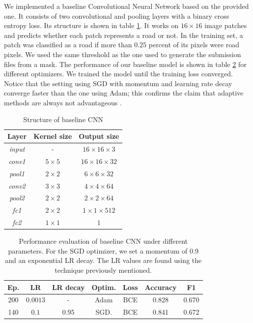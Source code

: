 \documentclass[10pt,conference,compsocconf]{IEEEtran}
\begin{document}
We implemented a baseline Convolutional Neural Network based on the provided one. It consists of two convolutional and pooling layers with a binary cross entropy loss. Its structure is shown in table \ref{tab:cnn_struct}. It works on $16 \times 16$ image patches and predicts whether each patch represents a road or not. In the training set, a patch was classified as a road if more than $0.25$ percent of its pixels were road pixels. We used the same threshold as the one used to generate the submission files from a mask. The performance of our baseline model is shown in table \ref{tab:cnn-perf} for different optimizers. We trained the model until the training loss converged. Notice that the setting using SGD with momentum and learning rate decay converge faster than the one using Adam; this confirms the claim that adaptive methods are always not advantageous \cite{wilson2018marginal}.

\begin{table}[ht]
    \centering
    \begin{tabular}{|c|c|c|}
        \hline
        Layer & Kernel size     & Output size  \\ \hline
        \textit{input} & -               & $16 \times 16 \times 3$\\ \hline
        \textit{conv1} & $5 \times 5$    & $16 \times 16 \times 32$ \\ \hline
        \textit{pool1} & $2 \times 2$    & $6 \times 6 \times 32 $\\ \hline
        \textit{conv2} & $3 \times 3$    & $ 4 \times 4 \times 64$ \\ \hline
        \textit{pool2} & $2 \times 2$    & $2 \times 2 \times 64$ \\ \hline
        \textit{fc1}   & $2 \times 2$    & $1 \times 1 \times 512$ \\ \hline
        \textit{fc2}   & $1 \times 1$    & $1$ \\ \hline
    \end{tabular}
    \caption{Structure of baseline CNN}
    \label{tab:cnn_struct}
\end{table}

\begin{table}[ht]
    \centering
    \begin{tabular}{|c|c|c|c|c|c|c|}
    \hline
        Ep.     & LR        & LR decay & Optim.     & Loss & Accuracy & F1      \\ \hline \hline
        200     & $0.0013$  & -        & Adam       & BCE  & 0.828   & 0.670   \\ \hline %
        140     & $0.1$     & 0.95     & SGD.       & BCE  & 0.841   & 0.672   \\ \hline %
        
    \end{tabular}
    \caption{Performance evaluation of baseline CNN under different parameters. For the SGD optimizer, we set a momentum of 0.9 and an exponential LR decay. The LR values are found using the technique previously mentioned.}
    \label{tab:cnn-perf}
\end{table}
\end{document}
